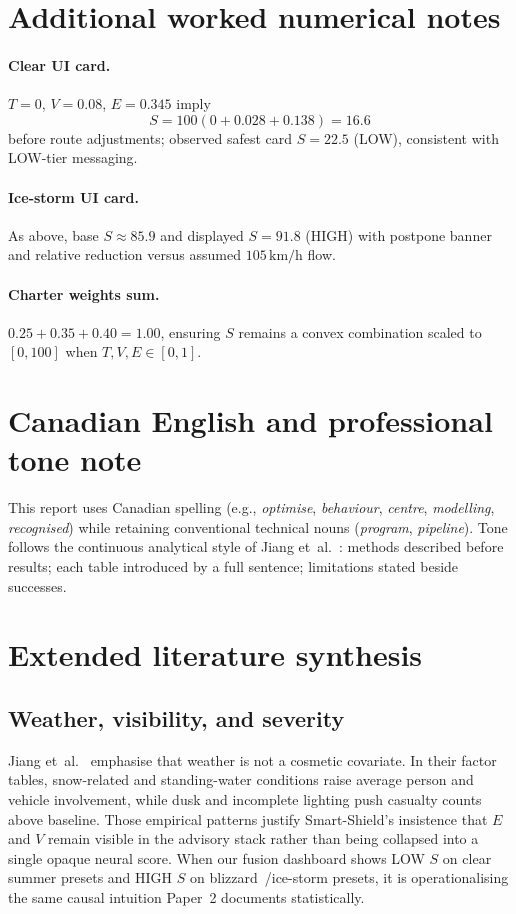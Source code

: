 \documentclass[11pt,a4paper]{article}
\begin{document}
\section*{Additional worked numerical notes}
\paragraph{Clear UI card.} $T=0$, $V=0.08$, $E=0.345$ imply
\[
S=100(0+0.028+0.138)=16.6
\]
before route adjustments; observed safest card $S=22.5$ (LOW), consistent with LOW-tier messaging.
\paragraph{Ice-storm UI card.} As above, base $S\approx85.9$ and displayed $S=91.8$ (HIGH) with postpone banner and relative reduction versus assumed $105\,\mathrm{km/h}$ flow.
\paragraph{Charter weights sum.} $0.25+0.35+0.40=1.00$, ensuring $S$ remains a convex combination scaled to $[0,100]$ when $T,V,E\in[0,1]$.

\section*{Canadian English and professional tone note}
This report uses Canadian spelling (e.g., \emph{optimise}, \emph{behaviour}, \emph{centre}, \emph{modelling}, \emph{recognised}) while retaining conventional technical nouns (\emph{program}, \emph{pipeline}). Tone follows the continuous analytical style of Jiang et~al.~\citep{jiang2024traffic}: methods described before results; each table introduced by a full sentence; limitations stated beside successes.



\newpage
\section*{Extended literature synthesis}
\label{sec:litext}

\subsection{Weather, visibility, and severity}
Jiang et~al.~\citep{jiang2024traffic} emphasise that weather is not a cosmetic covariate. In their factor tables, snow-related and standing-water conditions raise average person and vehicle involvement, while dusk and incomplete lighting push casualty counts above baseline. Those empirical patterns justify Smart-Shield's insistence that $E$ and $V$ remain visible in the advisory stack rather than being collapsed into a single opaque neural score. When our fusion dashboard shows LOW $S$ on clear summer presets and HIGH $S$ on blizzard~/ice-storm presets, it is operationalising the same causal intuition Paper~2 documents statistically.
\end{document}
